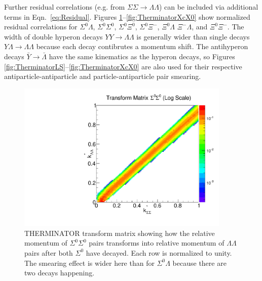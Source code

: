 Further residual correlations (e.g. from $\Sigma\Sigma \rightarrow \Lambda\Lambda$) can be included via additional terms in Eqn.\ \ref{eq:Residual}.  
Figures \ref{fig:TherminatorSS}--\ref{fig:TherminatorXcX0} show normalized residual correlations for $\Sigma^0\Lambda$, $\Sigma^0\Sigma^0$, $\Sigma^0\Xi^{0}$, $\Sigma^0\Xi^{-}$, $\Xi^0\Lambda$ $\Xi^{-}\Lambda$, and $\Xi^0\Xi^{-}$. 
The width of double hyperon decays $YY \rightarrow \Lambda\Lambda$ is generally wider than single decays $Y\Lambda \rightarrow \Lambda\Lambda$ because each decay contibrutes a momentum shift.
The antihyperon decays $\bar{Y} \rightarrow \bar{\Lambda}$ have the same kinematics as the hyperon decays, so Figures \ref{fig:TherminatorLS}--\ref{fig:TherminatorXcX0} are also used for their respective antiparticle-antiparticle and particle-antiparticle pair smearing.

\begin{figure}[hbtp]
\begin{center}
\includegraphics[width=24pc]{Figures/TransformMatrices/2016-7-20-TransformMatrixSigmaSigmaNormLog.pdf}
\end{center}
\caption[Transform matrix for $k^*_{\Sigma^0\Sigma^0} \rightarrow k^*_{\Lambda\Lambda}$]{THERMINATOR \cite{Chojnacki:2011hb} transform matrix showing how the relative momentum of $\Sigma^0\Sigma^0$ pairs transforms into relative momentum of $\Lambda\Lambda$ pairs after both $\Sigma^0$ have decayed. Each row is normalized to unity. The smearing effect is wider here than for $\Sigma^0\Lambda$ because there are two decays happening.}
\label{fig:TherminatorSS}
\end{figure}

